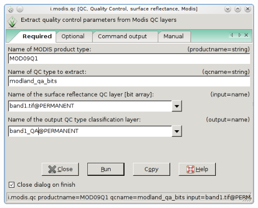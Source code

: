 \begin{center}
 \includegraphics[scale=0.45]{i_modis_qc.png}
\end{center}

\address{GRASS Development Team\\
  \url{http://grass.osgeo.org}\\
  }


